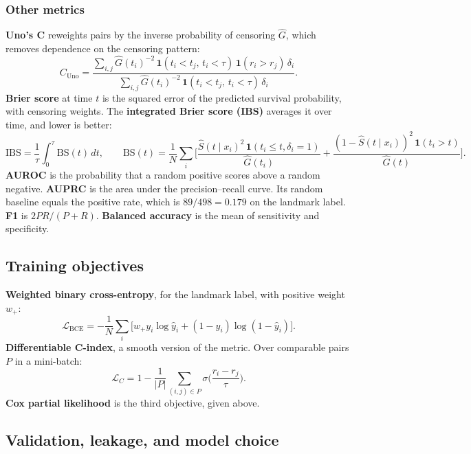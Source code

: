 \documentclass[11pt,a4paper]{article}
\newcommand{\term}[1]{\textbf{#1}}
\begin{document}
\subsubsection{Other metrics}
\textbf{Uno's C} reweights pairs by the inverse probability of censoring $\hat G$, which removes dependence on the censoring pattern:
\begin{equation}
C_{\text{Uno}}=\frac{\sum_{i,j}\hat G(t_i)^{-2}\,\mathbf{1}(t_i<t_j,\,t_i<\tau)\,\mathbf{1}(r_i>r_j)\,\delta_i}{\sum_{i,j}\hat G(t_i)^{-2}\,\mathbf{1}(t_i<t_j,\,t_i<\tau)\,\delta_i}.
\end{equation}
\textbf{Brier score} at time $t$ is the squared error of the predicted survival probability, with censoring weights. The \term{integrated Brier score (IBS)} averages it over time, and lower is better:
\begin{equation}
\mathrm{IBS}=\frac{1}{\tau}\int_0^{\tau}\mathrm{BS}(t)\,dt,\qquad
\mathrm{BS}(t)=\frac1N\sum_i\Big[\frac{\hat S(t\mid x_i)^2\,\mathbf{1}(t_i\le t,\delta_i=1)}{\hat G(t_i)}+\frac{(1-\hat S(t\mid x_i))^2\,\mathbf{1}(t_i>t)}{\hat G(t)}\Big].
\end{equation}
\textbf{AUROC} is the probability that a random positive scores above a random negative. \textbf{AUPRC} is the area under the precision--recall curve. Its random baseline equals the positive rate, which is $89/498=0.179$ on the landmark label. \textbf{F1} is $2PR/(P+R)$. \textbf{Balanced accuracy} is the mean of sensitivity and specificity.

\subsection{Training objectives}
\textbf{Weighted binary cross-entropy}, for the landmark label, with positive weight $w_+$:
\begin{equation}
\mathcal{L}_{\text{BCE}}=-\frac1N\sum_i\big[w_+y_i\log\hat y_i+(1-y_i)\log(1-\hat y_i)\big].
\end{equation}
\textbf{Differentiable C-index}, a smooth version of the metric. Over comparable pairs $P$ in a mini-batch:
\begin{equation}
\mathcal{L}_{C}=1-\frac{1}{|P|}\sum_{(i,j)\in P}\sigma\Big(\frac{r_i-r_j}{\tau}\Big).
\end{equation}
\textbf{Cox partial likelihood} is the third objective, given above.

\subsection{Validation, leakage, and model choice}
\end{document}

